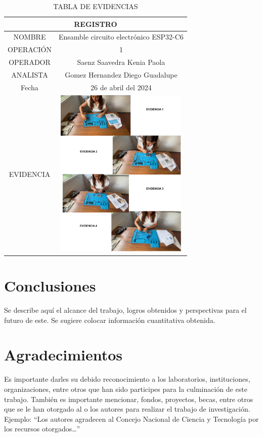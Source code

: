     \begin{table}[H]
        \huge
        \tiny
        \begin{tabular} {|c|c|}
        \hline
        \multicolumn{2}{|c|}{REGISTRO} \\
        \hline 
        NOMBRE & Ensamble circuito electrónico ESP32-C6 \\
        \hline
        OPERACIÓN & 1 \\
        \hline
        OPERADOR & Saenz Saavedra Kenia Paola \\
        \hline 
        ANALISTA & Gomez Hernandez Diego Guadalupe \\
        \hline
        Fecha & 26 de abril del 2024 \\
        \hline
        EVIDENCIA & \includegraphics[width=63mm]{13/img/Evidencia.pdf}\\
        \hline
        \end{tabular}
        \caption{TABLA DE EVIDENCIAS }
        \label{tab:mylabel}
    \end{table}
    
    \section{Conclusiones}
    
    Se describe aquí el alcance del trabajo, logros obtenidos y perspectivas para el futuro de este. Se sugiere colocar información cuantitativa obtenida.
    
    \section{Agradecimientos}
    
    Es importante darles su debido reconocimiento a los laboratorios, instituciones, organizaciones, entre otros que han sido participes para la culminación de este trabajo. También es importante mencionar, fondos, proyectos, becas, entre otros que se le han otorgado al o los autores para realizar el trabajo de investigación. Ejemplo: “Los autores agradecen al Concejo Nacional de Ciencia y Tecnología por los recursos otorgados…”
    
